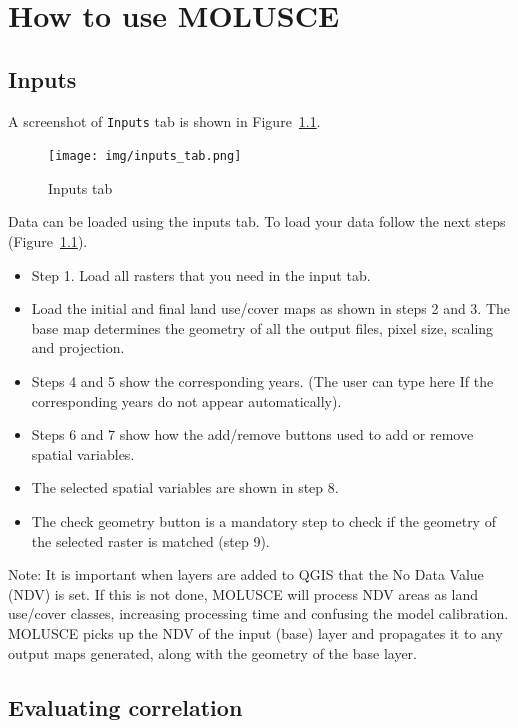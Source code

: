 \documentclass{report}
\begin{document}
\chapter{How to use MOLUSCE}

\section{Inputs}
A screenshot of \verb+Inputs+ tab is shown in Figure~\ref{fig:inputs_tab}.

\begin{figure}[h!]
\centering
\texttt{[image: img/inputs\_tab.png]}
\caption{Inputs tab}
\label{fig:inputs_tab}
\end{figure}

Data can be loaded using the inputs tab. To load your data follow the next steps (Figure~\ref{fig:inputs_tab}).

\begin{itemize}

  \item Step 1. Load all rasters that you need in the input tab. 
  \item Load the initial and final land use/cover maps as shown in steps 2 and 3. The base map determines
  the geometry of all the output files, pixel size, scaling and projection.
  \item Steps 4 and 5 show the corresponding years. (The user can type here If the corresponding years do
  not appear automatically).
  \item Steps 6 and 7 show how the add/remove buttons used to add or remove spatial variables.
  \item The selected spatial variables are shown in step 8.
  \item The check geometry button is a mandatory step to check if the geometry of the selected raster is
  matched (step 9).
\end{itemize}


Note: It is important when layers are added to QGIS that the No Data Value (NDV) is set. If this is
not done, MOLUSCE will process NDV areas as land use/cover classes, increasing processing time
and confusing the model calibration. MOLUSCE picks up the NDV of the input (base) layer and
propagates it to any output maps generated, along with the geometry of the base layer.

\section{Evaluating correlation}
\end{document}
